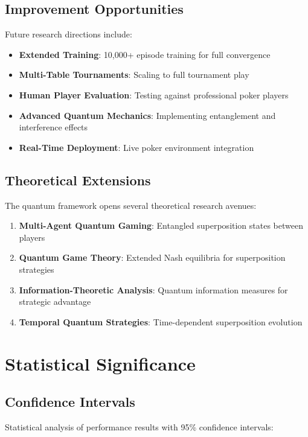 \documentclass[11pt,a4paper]{article}
\begin{document}
\subsection{Improvement Opportunities}

Future research directions include:

\begin{itemize}
\item \textbf{Extended Training}: 10,000+ episode training for full convergence
\item \textbf{Multi-Table Tournaments}: Scaling to full tournament play
\item \textbf{Human Player Evaluation}: Testing against professional poker players
\item \textbf{Advanced Quantum Mechanics}: Implementing entanglement and interference effects
\item \textbf{Real-Time Deployment}: Live poker environment integration
\end{itemize}

\subsection{Theoretical Extensions}

The quantum framework opens several theoretical research avenues:

\begin{enumerate}
\item \textbf{Multi-Agent Quantum Gaming}: Entangled superposition states between players
\item \textbf{Quantum Game Theory}: Extended Nash equilibria for superposition strategies
\item \textbf{Information-Theoretic Analysis}: Quantum information measures for strategic advantage
\item \textbf{Temporal Quantum Strategies}: Time-dependent superposition evolution
\end{enumerate}

\section{Statistical Significance}

\subsection{Confidence Intervals}

Statistical analysis of performance results with 95\% confidence intervals:
\end{document}
